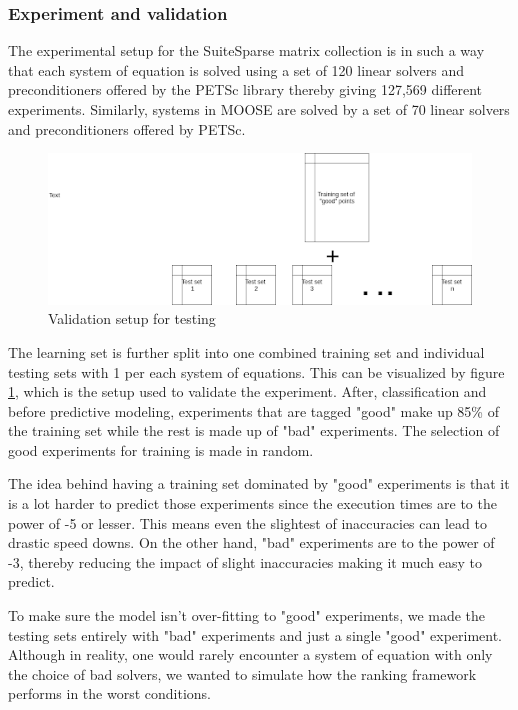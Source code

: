 \subsubsection{Experiment and validation}
The experimental setup for the SuiteSparse matrix collection is in such a way that each system of equation is solved using a set of 120 linear solvers and preconditioners offered by the PETSc library thereby giving 127,569 different experiments. Similarly, systems in MOOSE are solved by a set of 70 linear solvers and preconditioners offered by PETSc. 


\begin{figure}
    \centering
    \includegraphics[width=1\columnwidth]{figures/rank_split.png}
    \caption{Validation setup for testing}
    \label{Validation setup for testing}
\end{figure}

The learning set is further split into one combined training set and individual testing sets with 1 per each system of equations. This can be visualized by figure \ref{Validation setup for testing}, which is the setup used to validate the experiment. After, classification and before predictive modeling, experiments that are tagged "good" make up 85\% of the training set while the rest is made up of "bad" experiments. The selection of good experiments for training is made in random.

The idea behind having a training set dominated by "good" experiments is that it is a lot harder to predict those experiments since the execution times are to the power of -5 or lesser. This means even the slightest of inaccuracies can lead to drastic speed downs. On the other hand, "bad" experiments are to the power of -3, thereby reducing the impact of slight inaccuracies making it much easy to predict.

To make sure the model isn't over-fitting to "good" experiments, we made the testing sets entirely with "bad" experiments and just a single "good" experiment. Although in reality, one would rarely encounter a system of equation with only the choice of bad solvers, we wanted to simulate how the ranking framework performs in the worst conditions. 













